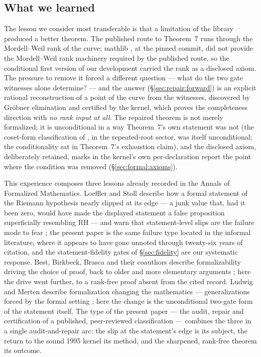 \documentclass[11pt]{amsart}
\begin{document}
\subsection{What we learned}\label{sec:lessons}

The lesson we consider most transferable is that a limitation of the
library produced a better theorem.  The published route to Theorem~7
runs through the Mordell--Weil rank of the curve; mathlib \cite{mathlib},
at the pinned commit, did not provide the Mordell--Weil rank machinery
required by the published route, so the conditional
first version of our development carried the rank as a disclosed axiom.
The pressure to remove it forced a different question --- what do the
two gate witnesses alone determine? --- and the answer
(\S\ref{sec:repair:forward}) is an explicit rational reconstruction of
a point of the curve from the witnesses, discovered by Gr\"obner
elimination and certified by the kernel, which proves the completeness
direction with \emph{no rank input at all}.  The repaired theorem is
not merely formalized; it is unconditional in a way Theorem~7's own statement was not (the
coset-form classification of \cite{BK1995}, in the repeated-root
sector, was itself unconditional; the conditionality sat in
Theorem~7's exhaustion claim), and the disclosed axiom, deliberately retained,
marks in the kernel's own per-declaration report the point where the
condition was removed (\S\ref{sec:formal:axioms}).

This experience composes three lessons already recorded in the
Annals of Formalized Mathematics.  Loeffler and Stoll describe how a formal statement of the
Riemann hypothesis nearly slipped at its edge --- a junk value that,
had it been zero, would have made the displayed statement a false
proposition superficially resembling RH --- and warn that
statement-level slips are the failure mode to fear
\cite{LoefflerStoll}; the present paper is the same failure type
located in the informal literature, where it appears to have gone
unnoted through twenty-six years of citation, and the statement-fidelity gates of
\S\ref{sec:fidelity} are our systematic response.  Best, Birkbeck,
Brasca and their coauthors describe formalizability driving the choice
of proof, back to older and more elementary arguments
\cite{BrascaEtAl}; here the drive went further, to a rank-free proof
absent from the cited record.  Ludwig and Merten describe formalization changing
the mathematics --- generalizations forced by the formal setting
\cite{LudwigMerten}; here the change is the unconditional two-gate
form of the statement itself.
The type of the present paper --- the audit, repair and certification
of a published, peer-reviewed classification --- combines the three in
a single audit-and-repair arc: the slip at the
statement's edge is its subject, the return to the sound 1995 kernel
its method, and the sharpened, rank-free theorem its outcome.
\end{document}
